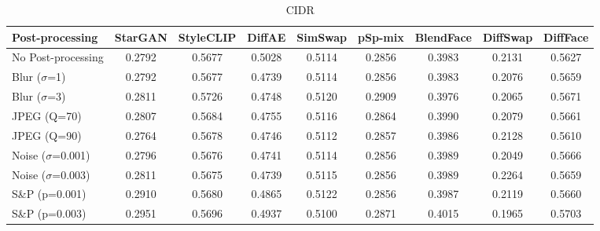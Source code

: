 \documentclass{article}
\begin{document}
\begin{table}[h!]
\begin{subtable}{\textwidth}
\caption{CIDR}
\centering
\scriptsize
\begin{tabular}{lcccccccc}
\toprule
\textbf{Post-processing} & StarGAN & StyleCLIP & DiffAE & SimSwap & pSp-mix & BlendFace & DiffSwap & DiffFace \\
\midrule
No Post-processing & 0.2792 & 0.5677 & 0.5028 & 0.5114 & 0.2856 & 0.3983 & 0.2131 & 0.5627 \\
\midrule
Blur ($\sigma$=1) & 0.2792 & 0.5677 & 0.4739 & 0.5114 & 0.2856 & 0.3983 & 0.2076 & 0.5659 \\
Blur ($\sigma$=3) & 0.2811 & 0.5726 & 0.4748 & 0.5120 & 0.2909 & 0.3976 & 0.2065 & 0.5671 \\
JPEG (Q=70) & 0.2807 & 0.5684 & 0.4755 & 0.5116 & 0.2864 & 0.3990 & 0.2079 & 0.5661 \\
JPEG (Q=90) & 0.2764 & 0.5678 & 0.4746 & 0.5112 & 0.2857 & 0.3986 & 0.2128 & 0.5610 \\
Noise ($\sigma$=0.001) & 0.2796 & 0.5676 & 0.4741 & 0.5114 & 0.2856 & 0.3989 & 0.2049 & 0.5666 \\
Noise ($\sigma$=0.003) & 0.2811 & 0.5675 & 0.4739 & 0.5115 & 0.2856 & 0.3989 & 0.2264 & 0.5659 \\
S\&P (p=0.001) & 0.2910 & 0.5680 & 0.4865 & 0.5122 & 0.2856 & 0.3987 & 0.2119 & 0.5660 \\
S\&P (p=0.003) & 0.2951 & 0.5696 & 0.4937 & 0.5100 & 0.2871 & 0.4015 & 0.1965 & 0.5703 \\
\bottomrule
\end{tabular}
\end{subtable}


\end{table}
\end{document}
